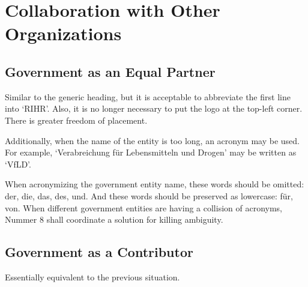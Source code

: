 
\section{Collaboration with Other Organizations}

\subsection{Government as an Equal Partner}

Similar to the generic heading, but it is acceptable to abbreviate the first line into `RIHR'.
Also, it is no longer necessary to put the logo at the top-left corner.
There is greater freedom of placement.

Additionally, when the name of the entity is too long, an acronym may be used.
For example, `Verabreichung für Lebensmitteln und Drogen'
may be written as `VfLD'.

When acronymizing the government entity name,
these words should be omitted:
der, die, das, des, und.
And these words should be preserved as lowercase:
für, von.
When different government entities are having a collision of acronyms,
Nummer 8 shall coordinate a solution for killing ambiguity.


\subsection{Government as a Contributor}

Essentially equivalent to the previous situation.







